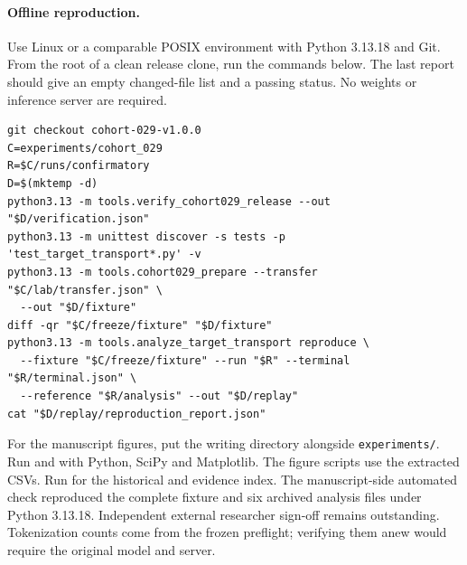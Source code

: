 \paragraph{Offline reproduction.}
Use Linux or a comparable POSIX environment with Python 3.13.18 and Git. From the root of a clean release clone, run the commands below. The last report should give an empty changed-file list and a passing status. No weights or inference server are required.
{\footnotesize\begin{verbatim}
git checkout cohort-029-v1.0.0
C=experiments/cohort_029
R=$C/runs/confirmatory
D=$(mktemp -d)
python3.13 -m tools.verify_cohort029_release --out "$D/verification.json"
python3.13 -m unittest discover -s tests -p 'test_target_transport*.py' -v
python3.13 -m tools.cohort029_prepare --transfer "$C/lab/transfer.json" \
  --out "$D/fixture"
diff -qr "$C/freeze/fixture" "$D/fixture"
python3.13 -m tools.analyze_target_transport reproduce \
  --fixture "$C/freeze/fixture" --run "$R" --terminal "$R/terminal.json" \
  --reference "$R/analysis" --out "$D/replay"
cat "$D/replay/reproduction_report.json"
\end{verbatim}}
For the manuscript figures, put the writing directory alongside \texttt{experiments/}. Run  and  with Python, SciPy and Matplotlib. The figure scripts use the extracted CSVs. Run  for the historical and evidence index. The manuscript-side automated check reproduced the complete fixture and six archived analysis files under Python 3.13.18. Independent external researcher sign-off remains outstanding. Tokenization counts come from the frozen preflight; verifying them anew would require the original model and server.

